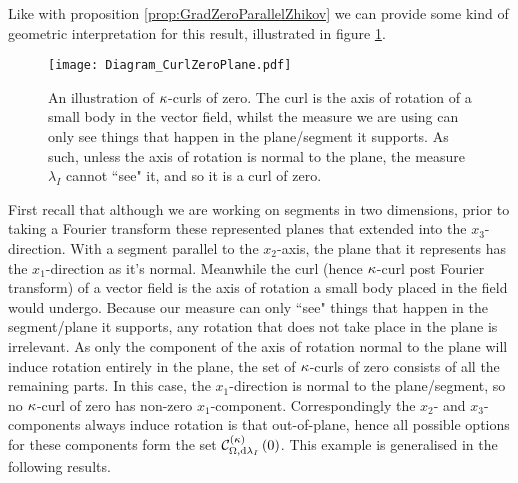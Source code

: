 Like with proposition \ref{prop:GradZeroParallelZhikov} we can provide some kind of geometric interpretation for this result, illustrated in figure \ref{fig:CurlZeroInterp}.
\begin{figure}[b!]
	\centering
	\texttt{[image: Diagram\_CurlZeroPlane.pdf]}
	\caption{\label{fig:CurlZeroInterp} An illustration of $\kappa$-curls of zero. The curl is the axis of rotation of a small body in the vector field, whilst the measure we are using can only see things that happen in the plane/segment it supports. As such, unless the axis of rotation is normal to the plane, the measure $\lambda_I$ cannot ``see" it, and so it is a curl of zero.}
\end{figure}
First recall that although we are working on segments in two dimensions, prior to taking a Fourier transform these represented planes that extended into the $x_3$-direction.
With a segment parallel to the $x_2$-axis, the plane that it represents has the $x_1$-direction as it's normal.
Meanwhile the curl (hence $\kappa$-curl post Fourier transform) of a vector field is the axis of rotation a small body placed in the field would undergo.
Because our measure can only ``see" things that happen in the segment/plane it supports, any rotation that does not take place in the plane is irrelevant.
As only the component of the axis of rotation normal to the plane will induce rotation entirely in the plane, the set of $\kappa$-curls of zero consists of all the remaining parts.
In this case, the $x_1$-direction is normal to the plane/segment, so no $\kappa$-curl of zero has non-zero $x_1$-component.
Correspondingly the $x_2$- and $x_3$-components always induce rotation is that out-of-plane, hence all possible options for these components form the set $\mathcal{C}_{ \Omega, \mathrm{d}\lambda_I}^{(\kappa)}\left( 0 \right)$.
This example is generalised in the following results. \newline

